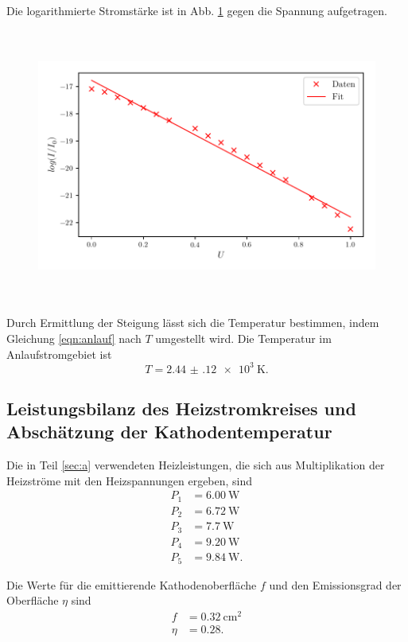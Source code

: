 \noindent Die logarithmierte Stromstärke ist in Abb. \ref{fig:plot3}
gegen die Spannung aufgetragen.
\begin{figure}
    \centering
    \includegraphics[width=15cm, height=9cm]{build/plot3.pdf}
    \caption{}
    \label{fig:plot3}
\end{figure}

\noindent Durch Ermittlung der Steigung lässt sich
die Temperatur bestimmen, indem Gleichung \eqref{eqn:anlauf}
nach $T$ umgestellt wird. 
Die Temperatur im Anlaufstromgebiet ist
\begin{equation*}
    T = \SI{2.44(12)e3}{\kelvin}.
\end{equation*}


\subsection{Leistungsbilanz des Heizstromkreises und Abschätzung der Kathodentemperatur}
Die in Teil \ref{sec:a} verwendeten Heizleistungen, die sich 
aus Multiplikation der Heizströme mit den Heizspannungen
ergeben, sind
\begin{align*}
    P_\text{1} &= \SI{6.00}{\watt} \\
    P_\text{2} &= \SI{6.72}{\watt} \\
    P_\text{3} &= \SI{7.7}{\watt} \\
    P_\text{4} &= \SI{9.20}{\watt} \\
    P_\text{5} &= \SI{9.84}{\watt}.
\end{align*}  %

\noindent Die Werte für die emittierende Kathodenoberfläche $f$ und den
Emissionsgrad der Oberfläche $\eta$ sind
\begin{align*}
    f &= \SI{0.32}{\centi\meter\squared} \\
    \eta &= \num{0.28}.
\end{align*}

